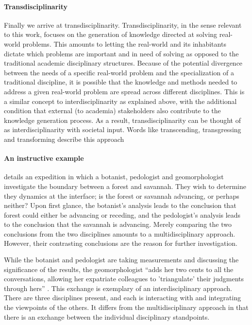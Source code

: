\documentclass[a4paper]{article}
\begin{document}
\paragraph{Transdisciplinarity}

Finally we arrive at transdisciplinarity. Transdisciplinarity, in the sense
relevant to this work, focuses on the generation of knowledge directed at
solving real-world problems. This amounts to letting the real-world and its
inhabitants dictate which problems are important and in need of solving as
opposed to the traditional academic disciplinary structures. Because of the
potential divergence between the needs of a specific real-world problem and
the specialization of a traditional discipline, it is possible that the
knowledge and methods needed to address a given real-world problem are spread
across different disciplines. This is a similar concept to
interdisciplinarity as explained above, with the additional condition that
external (to academia) stakeholders also contribute to the knowledge
generation process. As a result, transdisciplinarity can be thought of as
interdisciplinarity with societal input. Words like transcending,
transgressing and transforming describe this approach

\paragraph{An instructive example}

\cite{latour1999circulating} details an expedition in which a botanist,
pedologist and geomorphologist investigate the boundary between a forest and
savannah. They wish to determine they dynamics at the interface; is the forest
or savannah advancing, or perhaps neither? Upon first glance, the botanist's
analysis leads to the conclusion that forest could either be advancing or
receding, and the pedologist's analysis leads to the conclusion that the
savannah is advancing.  Merely comparing the two conclusions from the two
disciplines amounts to a multidisciplinary approach. However, their
contrasting conclusions are the reason for further investigation.

While the botanist and pedologist are taking measurements and discussing the
significance of the results, the geomorphologist ``adds her two cents to all
the conversations, allowing her expatriate colleagues to 'triangulate' their
judgments through hers'' \citep{latour1999circulating}. This exchange is
exemplary of an interdisciplinary approach. There are three disciplines
present, and each is interacting with and integrating the viewpoints of the
others. It differs from the multidisciplinary approach in that there is an
exchange between the individual disciplinary standpoints.
\end{document}
